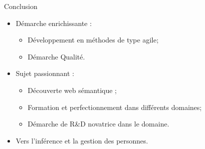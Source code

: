 \begin{frame}{Conclusion}
	\begin{itemize}
	\item Démarche enrichissante :
		\begin{itemize}
			\item Développement en méthodes de type agile;
			\item Démarche Qualité.
		\end{itemize}
		\vspace{0.2cm}
	\item Sujet passionnant :
		\begin{itemize}
			\item Découverte web sémantique ;
			\item Formation et perfectionnement dans différents domaines;
			\item Démarche de R\&D novatrice dans le domaine.
		\end{itemize}		
	\item Vers l'inférence et la gestion des personnes.
	\end{itemize}
\end{frame}
